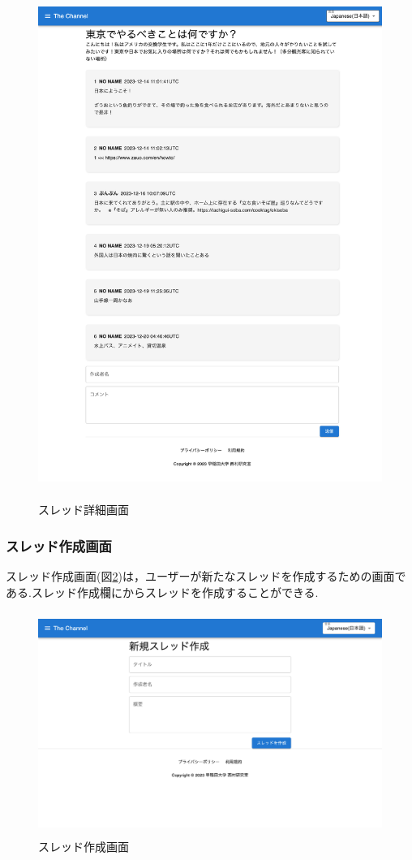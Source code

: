 \documentclass[b5paper,12pt,dvipdfmx]{jsreport}
\begin{document}
\begin{figure}[H]
	\centering
    \includegraphics[width=120mm,height=165.53mm]{./img/screen/thread_detail.png}
	\caption{スレッド詳細画面}
	\label{fig:thread_detail}
\end{figure}


\subsubsection{スレッド作成画面}
スレッド作成画面(図\ref{fig:thread_create})は，ユーザーが新たなスレッドを作成するための画面である.スレッド作成欄にからスレッドを作成することができる.

\begin{figure}[H]
	\centering
    \includegraphics[width=120mm,height=72.80mm]{./img/screen/thread_create.png}
	\caption{スレッド作成画面}
	\label{fig:thread_create}
\end{figure}
\end{document}
